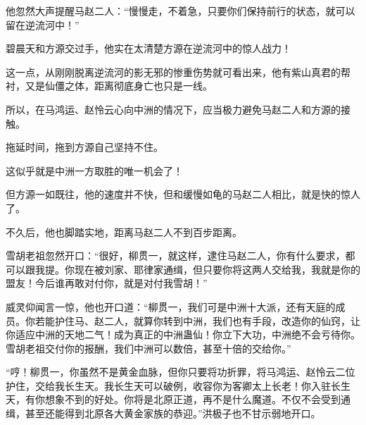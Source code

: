\begin{this_body}
他忽然大声提醒马赵二人：“慢慢走，不着急，只要你们保持前行的状态，就可以留在逆流河中！”

碧晨天和方源交过手，他实在太清楚方源在逆流河中的惊人战力！

这一点，从刚刚脱离逆流河的影无邪的惨重伤势就可看出来，他有紫山真君的帮衬，又是仙僵之体，距离彻底身亡也只是一线。

所以，在马鸿运、赵怜云心向中洲的情况下，应当极力避免马赵二人和方源的接触。

拖延时间，拖到方源自己坚持不住。

这似乎就是中洲一方取胜的唯一机会了！

但方源一如既往，他的速度并不快，但和缓慢如龟的马赵二人相比，就是快的惊人了。

不久后，他也脚踏实地，距离马赵二人不到百步距离。

雪胡老祖忽然开口：“很好，柳贯一，就这样，逮住马赵二人，你有什么要求，都可以跟我提。你现在被刘家、耶律家通缉，但只要你将这两人交给我，我就是你的盟友！今后谁再敢对付你，就是对付我雪胡！”

威灵仰闻言一惊，他也开口道：“柳贯一，我们可是中洲十大派，还有天庭的成员。你若能护住马、赵二人，就算你转到中洲，我们也有手段，改造你的仙窍，让你适应中洲的天地二气！成为真正的中洲蛊仙！你立下大功，中洲绝不会亏待你。雪胡老祖交付你的报酬，我们中洲可以数倍，甚至十倍的交给你。”

“哼！柳贯一，你虽然不是黄金血脉，但你只要将功折罪，将马鸿运、赵怜云二位护住，交给我长生天。我长生天可以破例，收容你为客卿太上长老！你入驻长生天，有你想象不到的好处。你将是北原正道，再不是什么魔道。不仅不会受到通缉，甚至还能得到北原各大黄金家族的恭迎。”洪极子也不甘示弱地开口。

\end{this_body}

